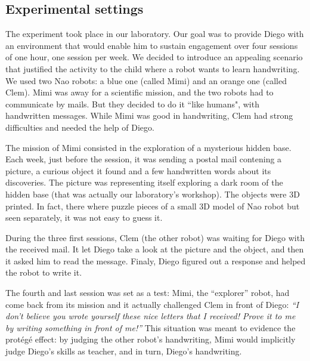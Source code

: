 \documentclass{sig-alternate}
\begin{document}

\subsection{Experimental settings}

The experiment took place in our laboratory. Our goal was to provide Diego with
an environment that would enable him to sustain engagement over four sessions 
of one hour, one session per week. We decided 
to introduce an appealing scenario that justified the activity to the child
where a robot wants to learn handwriting. We used two Nao robots: a blue one 
(called Mimi) and an orange one (called Clem). Mimi was away for a 
scientific mission, and the two robots had to communicate by mails. But they decided to do it 
``like humans", with handwritten messages. While Mimi was good in handwriting, 
Clem had strong difficulties and needed the help of Diego.

The mission of Mimi consisted in the exploration of a mysterious hidden
base. Each week, just before the session, it was sending a postal mail contening
a picture, a curious object it found and a few handwritten words about its discoveries. 
The picture was representing itself exploring 
a dark room of the hidden base (that was actually our laboratory's workshop). 
The objects were 3D printed. In fact, there where puzzle pieces of a small 3D 
model of Nao robot but seen separately, it was not easy to guess it.

During the three first sessions, Clem (the other robot) was waiting for Diego
with the received mail. It let Diego take a look at the picture and the object,
and then it asked him to read the message.
Finaly, Diego figured out a response and helped the robot to write it.

The fourth and last session was set as a test: Mimi, the ``explorer'' robot,
had come back from its mission and it actually challenged Clem in
front of Diego: \emph{``I don't believe you wrote yourself these nice letters that I
received! Prove it to me by writing something in front of me!''} This situation
was meant to evidence the prot\'eg\'e effect: by judging the other robot's
handwriting, Mimi would implicitly judge Diego's skills as
teacher, and in turn, Diego's handwriting.
\end{document}
